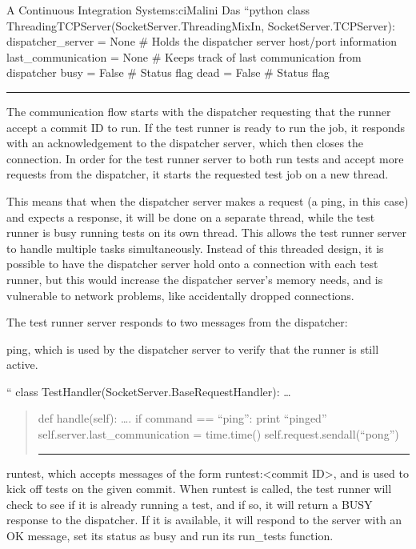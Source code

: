 \begin{aosachapter}{A Continuous Integration System}{s:ci}{Malini Das}
``python class ThreadingTCPServer(SocketServer.ThreadingMixIn,
SocketServer.TCPServer): dispatcher\_server = None \# Holds the
dispatcher server host/port information last\_communication = None \#
Keeps track of last communication from dispatcher busy = False \# Status
flag dead = False \# Status flag

\begin{center}\rule{3in}{0.4pt}\end{center}

The communication flow starts with the dispatcher requesting that the
runner accept a commit ID to run. If the test runner is ready to run the
job, it responds with an acknowledgement to the dispatcher server, which
then closes the connection. In order for the test runner server to both
run tests and accept more requests from the dispatcher, it starts the
requested test job on a new thread.

This means that when the dispatcher server makes a request (a ping, in
this case) and expects a response, it will be done on a separate thread,
while the test runner is busy running tests on its own thread. This
allows the test runner server to handle multiple tasks simultaneously.
Instead of this threaded design, it is possible to have the dispatcher
server hold onto a connection with each test runner, but this would
increase the dispatcher server's memory needs, and is vulnerable to
network problems, like accidentally dropped connections.

The test runner server responds to two messages from the dispatcher:

ping, which is used by the dispatcher server to verify that the runner
is still active.

`` class TestHandler(SocketServer.BaseRequestHandler): \ldots{}

\begin{quote}
\begin{aosadescription}

\item[def handle(self):]
\ldots{}. if command == ``ping'': print ``pinged''
self.server.last\_communication = time.time()
self.request.sendall(``pong'')
\end{aosadescription}

\begin{center}\rule{3in}{0.4pt}\end{center}
\end{quote}

runtest, which accepts messages of the form runtest:\textless{}commit
ID\textgreater{}, and is used to kick off tests on the given commit.
When runtest is called, the test runner will check to see if it is
already running a test, and if so, it will return a BUSY response to the
dispatcher. If it is available, it will respond to the server with an OK
message, set its status as busy and run its run\_tests function.


\end{aosachapter}
